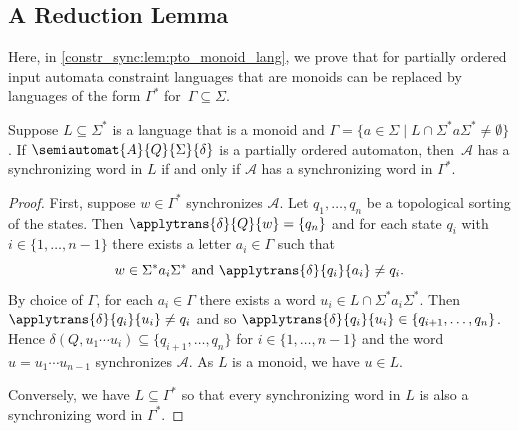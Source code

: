\subsection{A Reduction Lemma}
\label{constrinput:sec:pto:reduction}

Here, in \cref{constr_sync:lem:pto_monoid_lang}, we prove that for partially ordered input automata
constraint languages that are monoids can be replaced
by languages of the form $\Gamma^*$ for~$\Gamma \subseteq \Sigma$.

\begin{lemma}
	\label{constr_sync:lem:pto_monoid_lang}
	Suppose $L \subseteq \Sigma^*$ is a language that is a monoid
	and $\Gamma = \{ a \in \Sigma \mid L \cap \Sigma^* a \Sigma^* \ne \emptyset\}$.
	If $\semiautomat{A}{Q}{\Sigma}{\delta}$
	is a partially ordered automaton,
	then~$\mathcal A$ has a synchronizing word in $L$
	if and only if $\mathcal A$ has a synchronizing word in $\Gamma^*$.
\end{lemma}
\begin{proof}	
	First, suppose $w \in \Gamma^*$
	synchronizes $\mathcal A$.
	Let $q_1, \ldots, q_n$ be a topological sorting
	of the states. Then $\applytrans{\delta}{Q}{w} = \{q_n\}$
	and	for each state $q_i$ with $i \in \{1,\ldots,n-1\}$
	there exists a letter $a_i \in \Gamma$
	such that
	\[
	 w \in \Sigma^* a_i \Sigma^* \text{ and } \applytrans{\delta}{q_i}{a_i} \ne q_i.
	\]
	By choice of $\Gamma$, for each $a_i \in \Gamma$
	there exists a word $u_i \in L \cap \Sigma^* a_i \Sigma^*$.
	Then $\applytrans{\delta}{q_i}{u_{i}} \ne q_i$
	and so 	$\applytrans{\delta}{q_i}{u_{i}} \in \{q_{i+1}, \ldots, q_n \}$.
	Hence $\delta(Q, u_1 \cdots u_i) \subseteq \{q_{i+1},\ldots, q_n\}$ for $i \in \{1,\ldots,n-1\}$
	and the word $u = u_1 \cdots u_{n-1}$
	synchronizes $\mathcal A$. As $L$ is a monoid, we have $u \in L$.
	
	Conversely, we have $L \subseteq \Gamma^*$ 
	so that every synchronizing word in $L$ is also a synchronizing word in $\Gamma^*$.
\end{proof}

